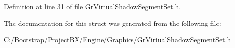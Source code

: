 Definition at line 31 of file GrVirtualShadowSegmentSet.h.

The documentation for this struct was generated from the following file:\begin{CompactItemize}
\item 
C:/Bootstrap/ProjectBX/Engine/Graphics/\hyperlink{_gr_virtual_shadow_segment_set_8h}{GrVirtualShadowSegmentSet.h}\end{CompactItemize}
